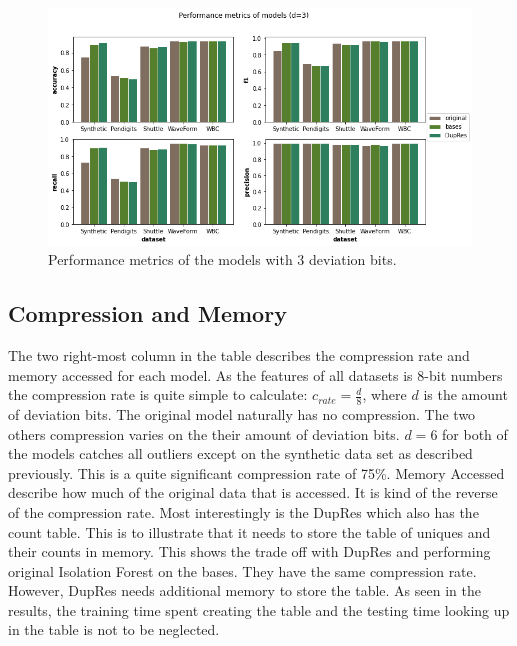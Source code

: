 \begin{figure}
  \centering
  \includegraphics[width=\linewidth]{images/performance_metrics.png}
  \caption{Performance metrics of the models with 3 deviation bits. }
  \label{fig:performance_metrics}
\end{figure}
\subsection{Compression and Memory}
The two right-most column in the table describes the compression rate and memory accessed for each model. As the features of all datasets is 8-bit numbers the compression rate is quite simple to calculate: $c_{rate}=\frac{d}{8}$, where $d$ is the amount of deviation bits. The original model naturally has no compression. The two others compression varies on the their amount of deviation bits. $d=6$ for both of the models catches all outliers except on the synthetic data set as described previously. This is a quite significant compression rate of 75\%. Memory Accessed describe how much of the original data that is accessed. It is kind of the reverse of the compression rate. Most interestingly is the DupRes which also has the count table. This is to illustrate that it needs to store the table of uniques and their counts in memory. This shows the trade off with DupRes and performing original Isolation Forest on the bases. They have the same compression rate. However, DupRes needs additional memory to store the table. As seen in the results, the training time spent creating the table and the testing time looking up in the table is not to be neglected.

